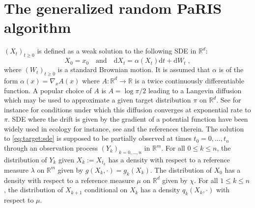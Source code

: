 \documentclass[12pt]{article}
\newcommand{\rmd}{\mathrm{d}}
\newcommand{\eqsp}{\;}
\newcommand{\1}{\mathrm{1}}
\newcommand{\qk}{q_{k}}
\begin{document}
\section{The generalized random PaRIS algorithm}
\label{sec:rwparis}
$(X_t)_{t\ge 0}$ is defined as a weak solution to the following SDE in $\mathbb{R}^d$:
\begin{equation}
\label{eq:target:sde}
X_0 = x_0\quad\mbox{and}\quad \rmd X_t = \alpha(X_t)\rmd t + \rmd W_t\eqsp,
\end{equation}
where $(W_t)_{t\ge 0}$ is a standard Brownian motion. It is assumed that $\alpha$ is of the form $\alpha(x) = \nabla_x A(x)$ where $A: \mathbb{R}^d \to \mathbb{R}$ is a twice continuously differentiable function. 
A popular choice of $A$  is $A = \log \pi/2$ leading to a Langevin diffusion which may be used to approximate a given target distribution $\pi$ on $\mathbb{R}^d$. See for instance \cite{roberts:tweedie:1996} for conditions under which this diffusion converges  at exponential rate to $\pi$. 
SDE where the drift is given by the gradient of a potential function have been widely used in ecology for instance, see \cite{brillinger:et:al:2011,harris:blackwell:2013,preisler:et:al:2013} and the references therein. The solution to \eqref{eq:target:sde} is supposed to be partially observed at times $t_0=0,\dots,t_n$ through an observation process $(Y_k)_{k=0,\dots,n}$ in $\mathbb{R}^m$. 
For all $0\le k \le n$, the distribution of $Y_k$ given $X_k:= X_{t_k}$ has a density with respect to a reference measure $\lambda$ on $\mathbb{R}^m$ given by $g(X_k,\cdot) = g_k(X_k)$. 
The distribution of $X_0$ has a density with respect to a reference measure $\mu$ on $\mathbb{R}^d$ given by $\chi$.
For all $1\le k \le n$, the distribution of $X_{k+1} $ conditional on $X_{k}$ has a density $\qk(X_{k},\cdot)$ with respect to $\mu$.
 
\end{document}
